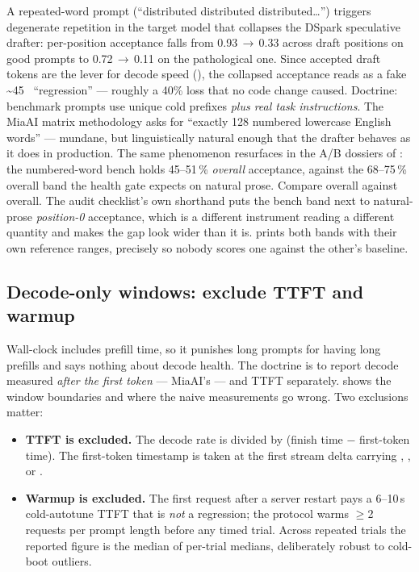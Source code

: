 A repeated-word prompt (``distributed distributed distributed\ldots'')
triggers degenerate repetition in the target model that collapses the
DSpark speculative drafter: per-position acceptance falls from
0.93\,$\to$\,0.33 across draft positions on good prompts to
0.72\,$\to$\,0.11 on the pathological one. Since accepted draft tokens are
the lever for decode speed (), the collapsed acceptance
reads as a fake \textasciitilde{}45~\tokspersec{} ``regression'' --- roughly a 40\%
loss that no code change caused. Doctrine: benchmark prompts use unique
cold prefixes \emph{plus real task instructions}. The MiaAI matrix
methodology asks for ``exactly 128 numbered lowercase English words'' ---
mundane, but linguistically natural enough that the drafter behaves as it
does in production. The same phenomenon resurfaces in the A/B dossiers of
: the numbered-word bench holds 45--51\,\% \emph{overall}
acceptance, against the 68--75\,\% overall band the health gate expects on
natural prose. Compare overall against overall. The audit checklist's own
shorthand puts the bench band next to natural-prose \emph{position-0}
acceptance, which is a different instrument reading a different quantity and
makes the gap look wider than it is.
 prints both bands with their own reference
ranges, precisely so nobody scores one against the other's baseline.

\subsection{Decode-only windows: exclude TTFT and warmup}

Wall-clock \tokspersec{} includes prefill time, so it punishes long prompts for
having long prefills and says nothing about decode health. The doctrine is
to report decode \tokspersec{} measured \emph{after the first token} ---
MiaAI's  --- and TTFT separately.
 shows the window boundaries and where the naive
measurements go wrong. Two exclusions matter:

\begin{itemize}
\item \textbf{TTFT is excluded.} The decode rate is
   divided by (finish time $-$ first-token
  time). The first-token timestamp is taken at the first stream delta
  carrying , , or .
\item \textbf{Warmup is excluded.} The first request after a server
  restart pays a 6--10\,s cold-autotune TTFT that is \emph{not} a
  regression; the protocol warms $\geq$2 requests per prompt length before
  any timed trial. Across repeated trials the reported figure is the
  median of per-trial medians, deliberately robust to cold-boot outliers.
\end{itemize}

